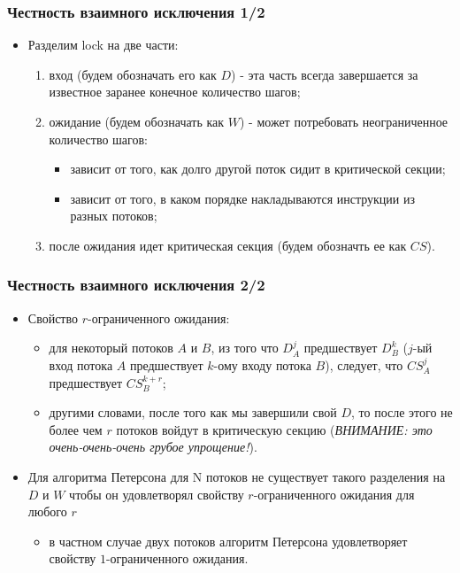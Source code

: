 \begin{frame}
\frametitle{Честность взаимного исключения 1/2}
\begin{itemize}
  \item Разделим lock на две части:
  \begin{enumerate}
    \item вход (будем обозначать его как $D$) - эта часть всегда завершается за
    известное заранее конечное количество шагов;
    \item ожидание (будем обозначать как $W$) - может потребовать неограниченное
    количество шагов:
    \begin{itemize}
      \item зависит от того, как долго другой поток сидит в критической секции;
      \item зависит от того, в каком порядке накладываются инструкции из разных
      потоков;
    \end{itemize}
    \item после ожидания идет критическая секция (будем обозначть ее как $CS$).
  \end{enumerate}
\end{itemize}
\end{frame}

\begin{frame}
\frametitle{Честность взаимного исключения 2/2}
\begin{itemize}
  \item Свойство $r$-ограниченного ожидания:
  \begin{itemize}
    \item для некоторый потоков $A$ и $B$, из того что $D^j_A$ предшествует
    $D^k_B$ ($j$-ый вход потока $A$ предшествует $k$-ому входу потока $B$),
    следует, что $CS^j_A$ предшествует $CS^{k + r}_B$;
    \item другими словами, после того как мы завершили свой $D$, то после этого
    не более чем $r$ потоков войдут в критическую секцию (\emph{ВНИМАНИЕ: это
    очень-очень-очень грубое упрощение!}).
  \end{itemize}
  \item Для алгоритма Петерсона для N потоков не существует такого разделения
  на $D$ и $W$ чтобы он удовлетворял свойству $r$-ограниченного ожидания для
  любого $r$
  \begin{itemize}
    \item в частном случае двух потоков алгоритм Петерсона удовлетворяет
    свойству $1$-ограниченного ожидания.
  \end{itemize}
\end{itemize}
\end{frame}

